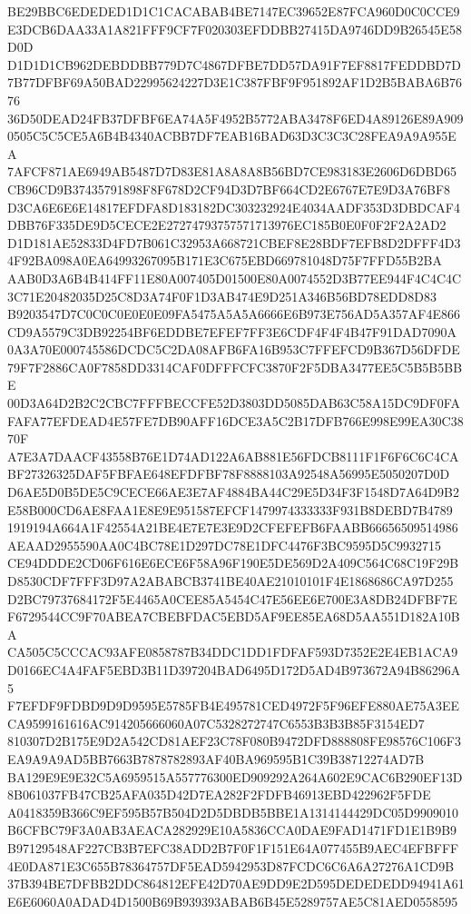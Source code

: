 \documentclass[UTF8,fontset=fandol,zihao=-4,a4paper]{ctexart}
\begin{document}
{{BE29BBC6EDEDED1D1C1CACABAB4BE7147EC39652E87FCA960D0C0CCE9E3DCB6DAA33A1A821FFF9CF7F020303EFDDBB27415DA9746DD9B26545E58D0D
D1D1D1CB962DEBDDBB779D7C4867DFBE7DD57DA91F7EF8817FEDDBD7D7B77DFBF69A50BAD22995624227D3E1C387FBF9F951892AF1D2B5BABA6B7676
36D50DEAD24FB37DFBF6EA74A5F4952B5772ABA3478F6ED4A89126E89A9090505C5C5CE5A6B4B4340ACBB7DF7EAB16BAD63D3C3C3C28FEA9A9A955EA
7AFCF871AE6949AB5487D7D83E81A8A8A8B56BD7CE983183E2606D6DBD65CB96CD9B37435791898F8F678D2CF94D3D7BF664CD2E6767E7E9D3A76BF8
D3CA6E6E6E14817EFDFA8D183182DC303232924E4034AADF353D3DBDCAF4DBB76F335DE9D5CECE2E27274793757571713976EC185B0E0F0F2F2A2AD2
D1D181AE52833D4FD7B061C32953A668721CBEF8E28BDF7EFB8D2DFFF4D34F92BA098A0EA64993267095B171E3C675EBD669781048D75F7FFD55B2BA
AAB0D3A6B4B414FF11E80A007405D01500E80A0074552D3B77EE944F4C4C4C3C71E20482035D25C8D3A74F0F1D3AB474E9D251A346B56BD78EDD8D83
B9203547D7C0C0C0E0E0E09FA5475A5A5A6666E6B973E756AD5A357AF4E866CD9A5579C3DB92254BF6EDDBE7EFEF7FF3E6CDF4F4F4B47F91DAD7090A
0A3A70E000745586DCDC5C2DA08AFB6FA16B953C7FFEFCD9B367D56DFDE79F7F2886CA0F7858DD3314CAF0DFFFCFC3870F2F5DBA3477EE5C5B5B5BBE
00D3A64D2B2C2CBC7FFFBECCFE52D3803DD5085DAB63C58A15DC9DF0FAFAFA77EFDEAD4E57FE7DB90AFF16DCE3A5C2B17DFB766E998E99EA30C3870F
A7E3A7DAACF43558B76E1D74AD122A6AB881E56FDCB8111F1F6F6C6C4CABF27326325DAF5FBFAE648EFDFBF78F8888103A92548A56995E5050207D0D
D6AE5D0B5DE5C9CECE66AE3E7AF4884BA44C29E5D34F3F1548D7A64D9B2E58B000CD6AE8FAA1E8E9E951587EFCF1479974333333F931B8DEBD7B4789
1919194A664A1F42554A21BE4E7E7E3E9D2CFEFEFB6FAABB66656509514986AEAAD2955590AA0C4BC78E1D297DC78E1DFC4476F3BC9595D5C9932715
CE94DDDE2CD06F616E6ECE6F58A96F190E5DE569D2A409C564C68C19F29BD8530CDF7FFF3D97A2ABABCB3741BE40AE21010101F4E1868686CA97D255
D2BC79737684172F5E4465A0CEE85A5454C47E56EE6E700E3A8DB24DFBF7EF6729544CC9F70ABEA7CBEBFDAC5EBD5AF9EE85EA68D5AA551D182A10BA
CA505C5CCCAC93AFE0858787B34DDC1DD1FDFAF593D7352E2E4EB1ACA9D0166EC4A4FAF5EBD3B11D397204BAD6495D172D5AD4B973672A94B86296A5
F7EFDF9FDBD9D9D9595E5785FB4E495781CED4972F5F96EFE880AE75A3EECA9599161616AC914205666060A07C5328272747C6553B3B3B85F3154ED7
810307D2B175E9D2A542CD81AEF23C78F080B9472DFD888808FE98576C106F3EA9A9A9AD5BB7663B7878782893AF40BA969595B1C39B38712274AD7B
BA129E9E9E32C5A6959515A557776300ED909292A264A602E9CAC6B290EF13D8B061037FB47CB25AFA035D42D7EA282F2FDFB46913EBD422962F5FDE
A0418359B366C9EF595B57B504D2D5DBDB5BBE1A1314144429DC05D9909010B6CFBC79F3A0AB3AEACA282929E10A5836CCA0DAE9FAD1471FD1E1B9B9
B97129548AF227CB3B7EFC38ADD2B7F0F1F151E64A077455B9AEC4EFBFFF4E0DA871E3C655B78364757DF5EAD5942953D87FCDC6C6A6A27276A1CD9B
37B394BE7DFBB2DDC864812EFE42D70AE9DD9E2D595DEDEDEDD94941A61E6E6060A0ADAD4D1500B69B939393ABAB6B45E5289757AE5C81AED0558595
}}
\end{document}

